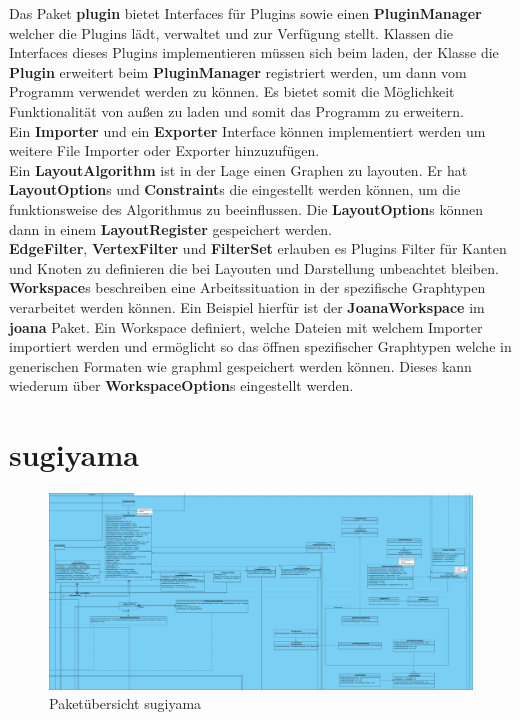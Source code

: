 Das Paket \textbf{plugin} bietet Interfaces für Plugins sowie einen \textbf{PluginManager} welcher die Plugins lädt, verwaltet und zur Verfügung stellt. Klassen die Interfaces dieses Plugins implementieren müssen sich beim laden, der Klasse die \textbf{Plugin} erweitert beim \textbf{PluginManager} registriert werden, um dann vom Programm verwendet werden zu können. Es bietet somit die Möglichkeit Funktionalität von außen zu laden und somit das Programm zu erweitern. \\
Ein \textbf{Importer} und ein \textbf{Exporter} Interface können implementiert werden um weitere File Importer oder Exporter hinzuzufügen. \\
Ein \textbf{LayoutAlgorithm} ist in der Lage einen Graphen zu layouten. Er hat \textbf{LayoutOption}s und \textbf{Constraint}s die eingestellt werden können, um die funktionsweise des Algorithmus zu beeinflussen. Die \textbf{LayoutOption}s können dann in einem \textbf{LayoutRegister} gespeichert werden. \\
\textbf{EdgeFilter}, \textbf{VertexFilter} und \textbf{FilterSet} erlauben es Plugins Filter für Kanten und Knoten zu definieren die bei Layouten und Darstellung unbeachtet bleiben. \\
\textbf{Workspace}s beschreiben eine Arbeitssituation in der spezifische Graphtypen verarbeitet werden können. Ein Beispiel hierfür ist der \textbf{JoanaWorkspace} im \textbf{joana} Paket. Ein Workspace definiert, welche Dateien mit welchem Importer importiert werden und ermöglicht so das öffnen spezifischer Graphtypen welche in generischen Formaten wie graphml gespeichert werden können. Dieses kann wiederum über \textbf{WorkspaceOption}s eingestellt werden.\\

\newpage

\section{sugiyama}

\begin{figure}[hb]
  \centering
  \includegraphics[width=380pt]{resourcen/sugiyama.png}
  \caption{Paketübersicht sugiyama}
  \label{fig:packge_sugiyama}
\end{figure}

